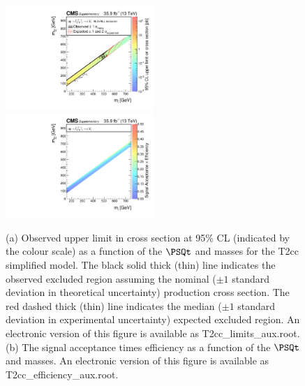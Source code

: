 \begin{figure}
    \begin{center}
            \includegraphics[width=0.50\textwidth]{Supplementary/T2ccXSEC}
            \includegraphics[width=0.50\textwidth]{Supplementary/T2cc_efficiency_aux}
        \caption{ (a) Observed upper limit in cross section at 95\% CL (indicated
        by the colour scale) as a function of 
        the $\PSQt$ and \PSGczDo %
        masses for the 
        T2cc %
        simplified  model.  The  black  solid thick  (thin)  line indicates  the
        observed  excluded  region  assuming   the  nominal  (${\pm}1$  standard
        deviation in theoretical uncertainty)  production cross section. The red
        dashed  thick  (thin)  line  indicates  the  median  (${\pm}1$  standard
        deviation in experimental uncertainty) expected excluded region.
    An electronic version of this figure is available as T2cc\_limits\_aux.root.
        (b) The signal acceptance times efficiency as a function of 
        the $\PSQt$ and \PSGczDo %
        masses.
    An electronic version of this figure is available as T2cc\_efficiency\_aux.root.
        }
        \label{fig:T2cc}
    \end{center}
\end{figure}

